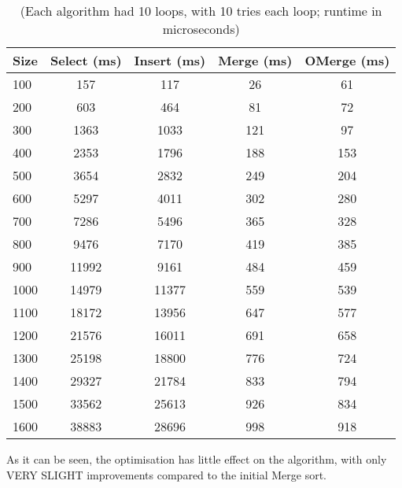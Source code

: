 \documentclass[a4paper,11pt]{article}
\begin{document}
\begin{table}[h]
\begin{center}
\begin{tabular}{l|c|c|c|c}
\textbf{Size} & \textbf{Select (ms)} & \textbf{Insert (ms)} & \textbf{Merge (ms)} & \textbf{OMerge (ms)}\\
\hline
  100      &  157 &     117 &     26 &     61\\
  200      &  603 &     464 &     81 &     72\\
  300      &  1363 &     1033 &     121 &     97\\
  400      &  2353 &     1796 &     188 &     153\\
  500      &  3654 &     2832 &     249 &     204\\
  600      &  5297 &     4011 &     302 &     280\\
  700      &  7286 &     5496 &     365 &     328\\
  800      &  9476 &     7170 &     419 &     385\\
  900      &  11992 &     9161 &     484 &     459\\
  1000        &  14979 &     11377 &     559 &     539\\
  1100        &  18172 &     13956 &     647 &     577\\
  1200        &  21576 &     16011 &     691 &     658\\
  1300        &  25198 &     18800 &     776 &     724\\
  1400        &  29327 &     21784 &     833 &     794\\
  1500        &  33562 &     25613 &     926 &     834\\
  1600        &  38883 &     28696 &     998 &     918\\
\end{tabular}
\caption{(Each algorithm had 10 loops, with 10 tries each loop; runtime in microseconds)}
\label{tab:table1}
\end{center}
\end{table}

As it can be seen, the optimisation has little effect on the algorithm, with only VERY SLIGHT improvements compared to the initial Merge sort. 
\end{document}
